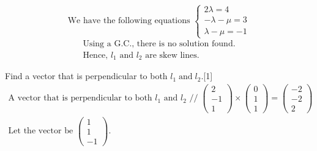 \documentclass[12pt, a4 paper]{article}
\begin{document}
\begin{outline}[enumerate]
					\[{\textrm{We have the following equations }}\left\{ \begin{array}{l}2\lambda  = 4\\ - \lambda  - \mu  = 3\\\lambda  - \mu  =  - 1\end{array} \right.\]
					\[\begin{array}{l}{\textrm{Using a G}}{\textrm{.C}}{\textrm{., there is no solution found}}{\textrm{.}}\\{\textrm{Hence, }}{l_1}{\textrm{ and }}{l_2}{\textrm{ are skew lines}}{\textrm{.}}\end{array}\]
																	
					\color{black}
					\2 Find a vector that is perpendicular to both ${l_1}\;{\textrm{and}}\;{l_2}$.\hfill[1]
					\color{blue}
					\[\begin{array}{l}{\textrm{A vector that is perpendicular to both }}{l_1}{\textrm{ and }}{l_2}{\textrm{ //}}\;\left( {\begin{array}{*{20}{c}}2\\{ - 1}\\1\end{array}} \right) \times \left( {\begin{array}{*{20}{c}}0\\1\\1\end{array}} \right) = \left( {\begin{array}{*{20}{c}}{ - 2}\\{ - 2}\\2\end{array}} \right)\\{\textrm{Let the vector be }}\left( {\begin{array}{*{20}{c}}1\\1\\{ - 1}\end{array}} \right).\end{array}\]
																								    

\end{outline}
\end{document}
